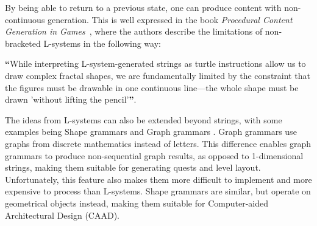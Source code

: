By being able to return to a previous state, one can produce content with non-continuous generation.
This is well expressed in the book \textit{Procedural Content Generation in Games}~\cite[p.77]{pcg_in_games}, where the authors describe the limitations of non-bracketed L-systems in the following way:

\vspace{-0.5cm}
\begin{center}
\textbf{“}While interpreting L-system-generated strings as turtle instructions allow us to draw complex fractal shapes, we are fundamentally limited by the constraint that the figures must be drawable in one continuous line—the whole shape must be drawn 'without lifting the pencil'\textbf{”}. 
\end{center}

The ideas from L-systems can also be extended beyond strings, with some examples being Shape grammars \cite{shape_grammars} and Graph grammars \cite{graph_grammars}.
Graph grammars use graphs from discrete mathematics instead of letters.
This difference enables graph grammars to produce non-sequential graph results, as opposed to 1-dimensional strings, making them suitable for generating quests and level layout.
Unfortunately, this feature also makes them more difficult to implement and more expensive to process than L-systems.
Shape grammars are similar, but operate on geometrical objects instead, making them suitable for Computer-aided Architectural Design (CAAD).